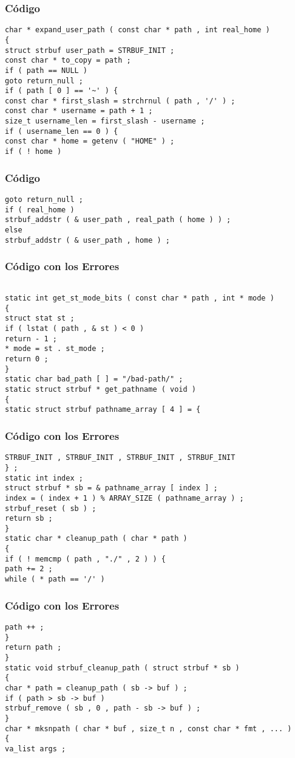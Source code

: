 \documentclass{beamer}
\begin{document}
\begin{frame}[fragile]
\frametitle{C\'odigo}
\begin{verbatim}
char * expand_user_path ( const char * path , int real_home ) 
{ 
struct strbuf user_path = STRBUF_INIT ; 
const char * to_copy = path ; 
if ( path == NULL ) 
goto return_null ; 
if ( path [ 0 ] == '~' ) { 
const char * first_slash = strchrnul ( path , '/' ) ; 
const char * username = path + 1 ; 
size_t username_len = first_slash - username ; 
if ( username_len == 0 ) { 
const char * home = getenv ( "HOME" ) ; 
if ( ! home ) 
\end{verbatim}
\end{frame}
\begin{frame}[fragile]
\frametitle{C\'odigo}
\begin{verbatim}
goto return_null ; 
if ( real_home ) 
strbuf_addstr ( & user_path , real_path ( home ) ) ; 
else 
strbuf_addstr ( & user_path , home ) ; \end{verbatim}
\end{frame}
\begin{frame}[fragile]
\frametitle{C\'odigo con los Errores}
\begin{verbatim}

static int get_st_mode_bits ( const char * path , int * mode ) 
{ 
struct stat st ; 
if ( lstat ( path , & st ) < 0 ) 
return - 1 ; 
* mode = st . st_mode ; 
return 0 ; 
} 
static char bad_path [ ] = "/bad-path/" ; 
static struct strbuf * get_pathname ( void ) 
{ 
static struct strbuf pathname_array [ 4 ] = { 
\end{verbatim}
\end{frame}
\begin{frame}[fragile]
\frametitle{C\'odigo con los Errores}
\begin{verbatim}
STRBUF_INIT , STRBUF_INIT , STRBUF_INIT , STRBUF_INIT 
} ; 
static int index ; 
struct strbuf * sb = & pathname_array [ index ] ; 
index = ( index + 1 ) % ARRAY_SIZE ( pathname_array ) ; 
strbuf_reset ( sb ) ; 
return sb ; 
} 
static char * cleanup_path ( char * path ) 
{ 
if ( ! memcmp ( path , "./" , 2 ) ) { 
path += 2 ; 
while ( * path == '/' ) 
\end{verbatim}
\end{frame}
\begin{frame}[fragile]
\frametitle{C\'odigo con los Errores}
\begin{verbatim}
path ++ ; 
} 
return path ; 
} 
static void strbuf_cleanup_path ( struct strbuf * sb ) 
{ 
char * path = cleanup_path ( sb -> buf ) ; 
if ( path > sb -> buf ) 
strbuf_remove ( sb , 0 , path - sb -> buf ) ; 
} 
char * mksnpath ( char * buf , size_t n , const char * fmt , ... ) 
{ 
va_list args ; 
\end{verbatim}
\end{frame}
\end{document}
